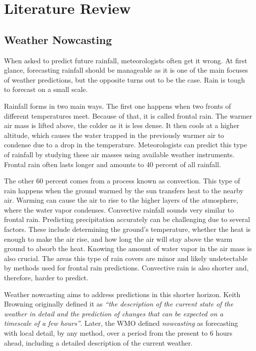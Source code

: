 
\chapter{Literature Review}
\label{chap:literature_review}

\section{Weather Nowcasting}
\label{sec:nowcasting}


When asked to predict future rainfall, meteorologists often get it wrong. At first glance, forecasting rainfall should be manageable as it is one of the main focuses of weather predictions, but the opposite turns out to be the case. Rain is tough to forecast on a small scale.

Rainfall forms in two main ways. The first one happens when two fronts of different temperatures meet. Because of that, it is called frontal rain. The warmer air mass is lifted above, the colder as it is less dense. It then cools at a higher altitude, which causes the water trapped in the previously warmer air to condense due to a drop in the temperature. Meteorologists can predict this type of rainfall by studying these air masses using available weather instruments. Frontal rain often lasts longer and amounts to 40 percent of all rainfall.

The other 60 percent comes from a process known as convection. This type of rain happens when the ground warmed by the sun transfers heat to the nearby air. Warming can cause the air to rise to the higher layers of the atmosphere, where the water vapor condenses. Convective rainfall sounds very similar to frontal rain. Predicting precipitation accurately can be challenging due to several factors. These include determining the ground's temperature, whether the heat is enough to make the air rise, and how long the air will stay above the warm ground to absorb the heat. Knowing the amount of water vapor in the air mass is also crucial. The areas this type of rain covers are minor and likely undetectable by methods used for frontal rain predictions. Convective rain is also shorter and, therefore, harder to predict.

Weather nowcasting aims to address predictions in this shorter horizon. Keith Browning originally defined it as \textit{``the description of the current state of the weather in detail and the prediction of changes that can be expected on a timescale of a few hours''}\cite{browningnowcating}. Later, the \gls{WMO} defined \textit{nowcasting} as forecasting with local detail, by any method, over a period from the present to 6 hours ahead, including a detailed description of the current weather.

